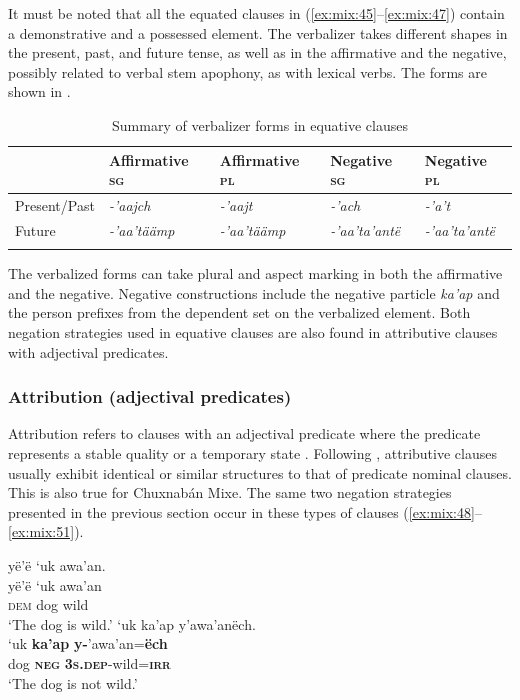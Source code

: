 \documentclass[output=paper,colorlinks,citecolor=brown,draft]{langscibook}
\begin{document}
It must be noted that all the equated clauses in (\ref{ex:mix:45}--\ref{ex:mix:47}) contain a demonstrative and a possessed element. The verbalizer takes different shapes in the present, past, and future tense, as well as in the affirmative and the negative, possibly related to verbal stem apophony, as with lexical verbs. The forms are shown in .

\begin{table}
\begin{tabularx}{\textwidth}{lllll} 
\lsptoprule
& {Affirmative \textsc{sg}} & {Affirmative \textsc{pl}} & {Negative \textsc{sg}} & {Negative \textsc{pl}}\\
\midrule 
{Present/Past} & \textit{{}-’aajch} & \textit{{}-’aajt} & \textit{{}-’ach} & \textit{{}-’a’t}\\
{Future} & {\textit{-’aa’täämp}} &{\textit{-’aa’täämp}} &  {\textit{-’aa’ta’antë}}&  {\textit{-’aa’ta’antë}}\\
\lspbottomrule
\end{tabularx}
\caption{Summary of verbalizer forms in equative clauses}
\label{tab:mix:5}
\end{table}


The verbalized forms can take plural and aspect marking in both the affirmative and the negative. Negative constructions include the negative particle \textit{ka’ap} and the person prefixes from the dependent set on the verbalized element. Both negation strategies used in equative clauses are also found in attributive clauses with adjectival predicates.

\subsubsection{Attribution (adjectival predicates)}\label{sec:mix:2.3.2}

Attribution refers to clauses with an adjectival predicate where the predicate represents a stable quality or a temporary state \citep{Hengeveld1992}. Following \citet[120]{Payne1997}, attributive clauses usually exhibit identical or similar structures to that of predicate nominal clauses. This is also true for Chuxnabán Mixe. The same two negation strategies presented in the previous section occur in these types of clauses (\ref{ex:mix:48}--\ref{ex:mix:51}). 
 
\ea\label{ex:mix:48}
    \ea\label{ex:mix:48a}
        \glll yë’ë ‘uk awa’an.\\ 
              yë’ë ‘uk awa’an\\
              \textsc{dem} dog wild\\
        \glt ‘The dog is wild.’
    \ex\label{ex:mix:48b}
        \glll  ‘uk ka’ap y’awa’anëch. \\
             ‘uk \textbf{ka’ap} \textbf{y-}’awa’an=\textbf{ëch}\\
             dog \textbf{\textsc{neg}} \textbf{\textsc{3s.dep}}{}-wild=\textbf{\textsc{irr}}\\
        \glt ‘The dog is not wild.’
    \z
\z 
 
\end{document}
